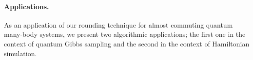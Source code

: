 \documentclass[11pt]{article}
\theoremstyle{plain}
\newcommand{\eps}{\varepsilon}
\begin{document}




\paragraph{Applications.} As an application of our rounding technique for almost commuting quantum many-body
systems, we present two algorithmic applications; the first one in the context of quantum
Gibbs sampling and the second in the context of Hamiltonian simulation.
\end{document}
